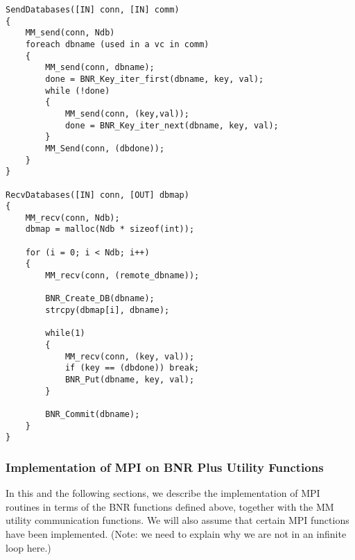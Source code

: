\documentclass{article}
\begin{document}
\begin{verbatim}
SendDatabases([IN] conn, [IN] comm)
{
    MM_send(conn, Ndb)
    foreach dbname (used in a vc in comm)
    {
        MM_send(conn, dbname);
        done = BNR_Key_iter_first(dbname, key, val);
        while (!done)
        {
            MM_send(conn, (key,val));
            done = BNR_Key_iter_next(dbname, key, val);
        }
        MM_Send(conn, (dbdone));
    }
}

RecvDatabases([IN] conn, [OUT] dbmap)
{
    MM_recv(conn, Ndb);
    dbmap = malloc(Ndb * sizeof(int));
    
    for (i = 0; i < Ndb; i++)
    {
        MM_recv(conn, (remote_dbname));

        BNR_Create_DB(dbname);
        strcpy(dbmap[i], dbname);
        
        while(1)
        {
            MM_recv(conn, (key, val));
            if (key == (dbdone)) break;
            BNR_Put(dbname, key, val);
        }

        BNR_Commit(dbname);
    }
}
\end{verbatim}

\subsubsection{Implementation of MPI on BNR Plus Utility Functions}

In this and the following sections, we describe the implementation of MPI
routines in terms of the BNR functions defined above, together with the
MM utility communication functions.  We will also assume that certain
MPI functions have been implemented.  (Note:  we need to explain why we are
not in an infinite loop here.)
\end{document}
